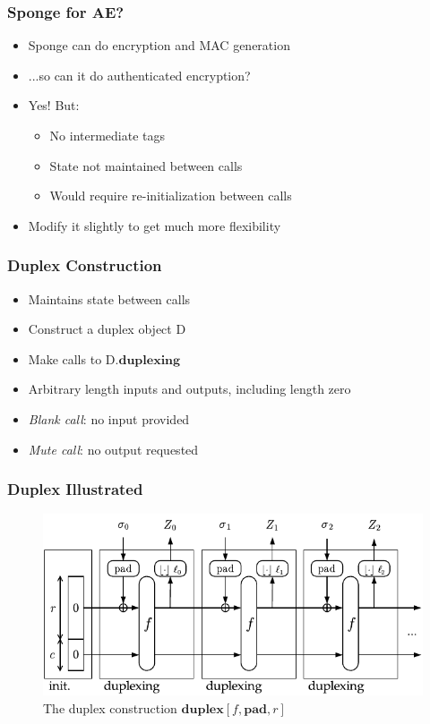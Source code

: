 \begin{frame}
\frametitle{Sponge for AE?}
\begin{itemize}
  \item Sponge can do encryption and MAC generation
  \item ...so can it do authenticated encryption?
  \item Yes! But:
  \begin{itemize}
    \item No intermediate tags
    \item State not maintained between calls
    \item Would require re-initialization between calls
  \end{itemize}
  \item Modify it slightly to get much more flexibility
\end{itemize}
\end{frame}

\begin{frame}
\frametitle{Duplex Construction}
\begin{itemize}
  \item Maintains state between calls
  \item Construct a duplex object $\mathrm{D}$
  \item Make calls to $\mathrm{D}.\mathbf{duplexing}$
  \item Arbitrary length inputs and outputs, including length zero
  \item \emph{Blank call}: no input provided
  \item \emph{Mute call}: no output requested
\end{itemize}
\end{frame}

\begin{frame}
\frametitle{Duplex Illustrated}
\begin{figure}[ht]
\centering
\includegraphics[width=\textwidth]{img/Duplex.pdf}
\caption{The duplex construction $\mathbf{duplex}[f,\mathbf{pad},r]$ \cite{Bertoni2011_SpongeFunctions}}
\label{fig:Duplex}
\end{figure}
\end{frame}


